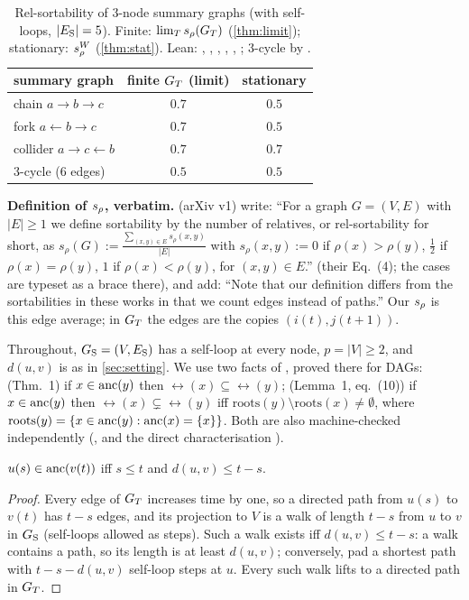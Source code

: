 \begin{table}[h]
\caption{Rel-sortability of 3-node summary graphs (with self-loops, $|E_{\mathrm S}|=5$).
Finite: $\lim_Ts_\rho(G_T)$ (\cref{thm:limit}); stationary: $s_\rho^W$
(\cref{thm:stat}). Lean: , ,
, , ,
; 3-cycle by .}
\label{tab:examples}
\vskip -0.05in
\centering\footnotesize
\setlength{\tabcolsep}{3pt}
\begin{tabular}{lcc}
\toprule
summary graph & finite $\GT$ (limit) & stationary \\
\midrule
chain $a\!\to\! b\!\to\! c$ & $0.7$ & $0.5$ \\
fork $a\!\leftarrow\! b\!\to\! c$ & $0.7$ & $0.5$ \\
collider $a\!\to\! c\!\leftarrow\! b$ & $0.7$ & $0.7$ \\
3-cycle (6 edges) & $0.5$ & $0.5$ \\
\bottomrule
\end{tabular}
\vskip -0.1in
\end{table}

\textbf{Definition of $s_\rho$, verbatim.} \citet[Sec.~2.2]{reisach2026topological}
(arXiv v1) write: ``For a graph $G=(V,E)$ with $|E|\ge1$ we define sortability
by the number of relatives, or rel-sortability for short, as
$s_\rho(G):=\frac{\sum_{(x,y)\in E}s_\rho(x,y)}{|E|}$ with
$s_\rho(x,y):=0$ if $\rho(x)>\rho(y)$, $\frac12$ if $\rho(x)=\rho(y)$, $1$ if
$\rho(x)<\rho(y)$, for $(x,y)\in E$.'' (their Eq.~(4); the cases are typeset as a
brace there), and add: ``Note that our definition differs from the sortabilities
in these works in that we count edges instead of paths.'' Our $s_\rho$ is this
edge average; in $\GT$ the edges are the copies $(i(t),j(t{+}1))$.

Throughout, $G_{\mathrm S}=(V,E_{\mathrm S})$ has a self-loop at every node, $p=|V|\ge2$, and
$d(u,v)$ is as in \cref{sec:setting}. We use two facts of
\citet{reisach2026topological}, proved there for DAGs: (Thm.~1) if
$x\in\mathrm{anc}(y)$ then $\rel(x)\subseteq\rel(y)$; (Lemma~1, eq.~(10)) if
$x\in\mathrm{anc}(y)$ then $\rel(x)\subsetneq\rel(y)$ iff $\mathrm{roots}(y)\setminus
\mathrm{roots}(x)\ne\emptyset$, where $\mathrm{roots}(y)=\{x\in\mathrm{anc}(y):\mathrm{anc}(x)=\{x\}\}$.
Both are also machine-checked independently
(, and the direct characterisation
).

\begin{lemma}[ancestors in $\GT$]\label{lem:anc}
$u(s)\in\mathrm{anc}(v(t))$ iff $s\le t$ and $d(u,v)\le t-s$.
\end{lemma}
\begin{proof}
Every edge of $\GT$ increases time by one, so a directed path from $u(s)$ to
$v(t)$ has $t-s$ edges, and its projection to $V$ is a walk of length $t-s$
from $u$ to $v$ in $G_{\mathrm S}$ (self-loops allowed as steps). Such a walk exists iff
$d(u,v)\le t-s$: a walk contains a path, so its length is at least
$d(u,v)$; conversely, pad a shortest path with $t-s-d(u,v)$ self-loop steps at
$u$. Every such walk lifts to a directed path in $\GT$.
\end{proof}

